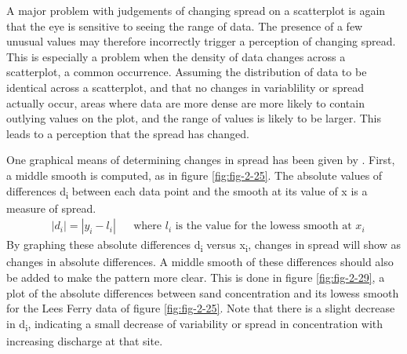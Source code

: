 \documentclass[]{book}
\begin{document}
A major problem with judgements of changing spread on a scatterplot is again that the eye is sensitive to seeing the range of data. The presence of a few unusual values may therefore incorrectly trigger a perception of changing spread. This is especially a problem when the density of data changes across a scatterplot, a common occurrence. Assuming the distribution of data to be identical across a scatterplot, and that no changes in variablility or spread actually occur, areas where data are more dense are more likely to contain outlying values on the plot, and the range of values is likely to be larger. This leads to a perception that the spread has changed.

One graphical means of determining changes in spread has been given by \citet{chambers_graphical_1983}. First, a middle smooth is computed, as in figure \ref{fig:fig-2-25}. The absolute values of differences \textbar{}d\textsubscript{i}\textbar{} between each data point and the smooth at its value of x is a measure of spread.
\begin{equation}
\begin{aligned}
& |d_{i}| = |y_{i} - l_{i}| && \text{where $l_{i}$ is the value for the lowess smooth at $x_{i}$}
\end{aligned}
\label{eq:2-3}
\end{equation}
By graphing these absolute differences \textbar{}d\textsubscript{i}\textbar{} versus x\textsubscript{i}, changes in spread will show as changes in absolute differences. A middle smooth of these differences should also be added to make the pattern more clear. This is done in figure \ref{fig:fig-2-29}, a plot of the absolute differences between sand concentration and its lowess smooth for the Lees Ferry data of figure \ref{fig:fig-2-25}. Note that there is a slight decrease in \textbar{}d\textsubscript{i}\textbar{}, indicating a small decrease of variability or spread in concentration with increasing discharge at that site.
\end{document}

